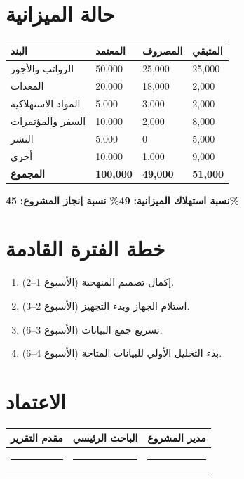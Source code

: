 \documentclass[11pt,a4paper]{article}
\begin{document}
\section{حالة الميزانية}
\label{sec:budget}

\begin{table}[H]
\centering
\renewcommand{\arraystretch}{1.4}
\begin{tabularx}{\textwidth}{L{5cm} C{3cm} C{3cm} C{3cm}}
\toprule
\textbf{البند} & \textbf{المعتمد} & \textbf{المصروف} & \textbf{المتبقي} \\
\midrule
الرواتب والأجور & 50,000 & 25,000 & 25,000 \\
المعدات & 20,000 & 18,000 & 2,000 \\
المواد الاستهلاكية & 5,000 & 3,000 & 2,000 \\
السفر والمؤتمرات & 10,000 & 2,000 & 8,000 \\
النشر & 5,000 & 0 & 5,000 \\
أخرى & 10,000 & 1,000 & 9,000 \\
\midrule
\textbf{المجموع} & \textbf{100,000} & \textbf{49,000} & \textbf{51,000} \\
\bottomrule
\end{tabularx}
\end{table}

\textbf{نسبة استهلاك الميزانية:} \textbf{49\%} \quad \textbf{نسبة إنجاز المشروع:} \textbf{45\%}

\section{خطة الفترة القادمة}
\label{sec:next}

\begin{enumerate}
    \item إكمال تصميم المنهجية (الأسبوع 1--2).
    \item استلام الجهاز وبدء التجهيز (الأسبوع 2--3).
    \item تسريع جمع البيانات (الأسبوع 3--6).
    \item بدء التحليل الأولي للبيانات المتاحة (الأسبوع 4--6).
\end{enumerate}

\section*{الاعتماد}
\begin{table}[H]
\centering
\renewcommand{\arraystretch}{2}
\begin{tabularx}{\textwidth}{L{4cm} X X}
\toprule
\textbf{مقدم التقرير} & \textbf{الباحث الرئيسي} & \textbf{مدير المشروع} \\
\midrule
\rule{4cm}{0.4pt} & \rule{4cm}{0.4pt} & \rule{4cm}{0.4pt} \\
\bottomrule
\end{tabularx}
\end{table}
\end{document}
